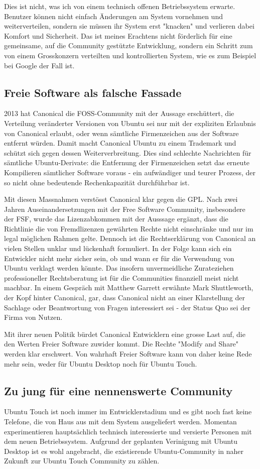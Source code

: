 Dies ist nicht, was ich von einem technisch offenen Betriebssystem erwarte. Benutzer können nicht einfach Änderungen am System vornehmen und weiterverteilen, sondern sie müssen ihr System erst "knacken" und verlieren dabei Komfort und Sicherheit. Das ist meines Erachtens nicht förderlich für eine gemeinsame, auf die Community gestützte Entwicklung, sondern ein Schritt zum von einem Grosskonzern verteilten und kontrollierten System, wie es zum Beispiel bei Google der Fall ist.

\subsection{Freie Software als falsche Fassade}
2013 hat Canonical die FOSS-Community mit der Aussage erschüttert, die Verteilung veränderter Versionen von Ubuntu sei nur mit der expliziten Erlaubnis von Canonical erlaubt, oder wenn sämtliche Firmenzeichen aus der Software entfernt würden. Damit macht Canonical Ubuntu zu einem Trademark und schützt sich gegen dessen Weiterverbreitung. Dies sind schlechte Nachrichten für sämtliche Ubuntu-Derivate: die Entfernung der Firmenzeichen setzt das erneute Kompilieren sämtlicher Software voraus - ein aufwändiger und teurer Prozess, der so nicht ohne bedeutende Rechenkapazität durchführbar ist.

Mit diesen Massnahmen verstösst Canonical klar gegen die GPL. Nach zwei Jahren Auseinandersetzungen mit der Free Software Community, insbesondere der FSF, wurde das Lizenzabkommen mit der Ausssage ergänzt, dass die Richtlinie die von Fremdlizenzen gewährten Rechte nicht einschränke und nur im legal möglichen Rahmen gelte. Dennoch ist die Rechtserklärung von Canonical an vielen Stellen unklar und lückenhaft formuliert. In der Folge kann sich ein Entwickler nicht mehr sicher sein, ob und wann er für die Verwendung von Ubuntu verklagt werden könnte. Das insofern unvermeidliche Zurateziehen professioneller Rechtsberatung ist für die Communities finanziell meist nicht machbar. In einem Gespräch mit Matthew Garrett erwähnte Mark Shuttleworth, der Kopf hinter Canonical, gar, dass Canonical nicht an einer Klarstellung der Sachlage oder Beantwortung von Fragen interessiert sei - der Status Quo sei der Firma von Nutzen.

Mit ihrer neuen Politik bürdet Canonical Entwicklern eine grosse Last auf, die den Werten Freier Software zuwider kommt. Die Rechte "Modify and Share" werden klar erschwert. Von wahrhaft Freier Software kann von daher keine Rede mehr sein, weder für Ubuntu Desktop noch für Ubuntu Touch.

\subsection{Zu jung für eine nennenswerte Community}
Ubuntu Touch ist noch immer im Entwicklerstadium und es gibt noch fast keine Telefone, die von Haus aus mit dem System ausgeliefert werden. Momentan experimentieren hauptsächlich technisch interessierte und versierte Personen mit dem neuen Betriebssystem. Aufgrund der geplanten Verinigung mit Ubuntu Desktop ist es wohl angebracht, die existierende Ubuntu-Community in naher Zukunft zur Ubuntu Touch Community zu zählen.